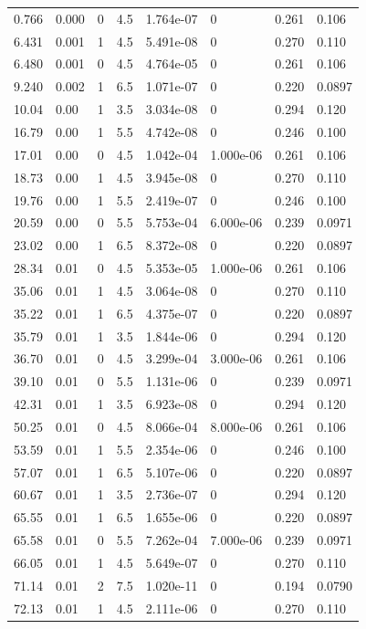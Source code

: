 \documentclass[preview]{standalone}
\begin{document}
{{\begin{tabular}{L{1.2cm}C{1.2cm} C{0.3cm}C{0.5cm} C{1.4cm}C{1.4cm} C{1.4cm}C{1.4cm}}
  0.766  &  0.000  & 0     & 4.5 &  1.764e-07  & 0  & 0.261 &  0.106   \\ 
  6.431  &  0.001  & 1     & 4.5 &  5.491e-08  & 0  & 0.270 &  0.110   \\ 
  6.480  &  0.001  & 0     & 4.5 &  4.764e-05  & 0  & 0.261 &  0.106   \\ 
  9.240  &  0.002  & 1     & 6.5 &  1.071e-07  & 0  & 0.220 &  0.0897   \\ 
  10.04  &  0.00  & 1     & 3.5 &  3.034e-08  & 0  & 0.294 &  0.120   \\ 
  16.79  &  0.00  & 1     & 5.5 &  4.742e-08  & 0  & 0.246 &  0.100   \\ 
  17.01  &  0.00  & 0     & 4.5 &  1.042e-04  & 1.000e-06  & 0.261 &  0.106   \\ 
  18.73  &  0.00  & 1     & 4.5 &  3.945e-08  & 0  & 0.270 &  0.110   \\ 
  19.76  &  0.00  & 1     & 5.5 &  2.419e-07  & 0  & 0.246 &  0.100   \\ 
  20.59  &  0.00  & 0     & 5.5 &  5.753e-04  & 6.000e-06  & 0.239 &  0.0971   \\ 
  23.02  &  0.00  & 1     & 6.5 &  8.372e-08  & 0  & 0.220 &  0.0897   \\ 
  28.34  &  0.01  & 0     & 4.5 &  5.353e-05  & 1.000e-06  & 0.261 &  0.106   \\ 
  35.06  &  0.01  & 1     & 4.5 &  3.064e-08  & 0  & 0.270 &  0.110   \\ 
  35.22  &  0.01  & 1     & 6.5 &  4.375e-07  & 0  & 0.220 &  0.0897   \\ 
  35.79  &  0.01  & 1     & 3.5 &  1.844e-06  & 0  & 0.294 &  0.120   \\ 
  36.70  &  0.01  & 0     & 4.5 &  3.299e-04  & 3.000e-06  & 0.261 &  0.106   \\ 
  39.10  &  0.01  & 0     & 5.5 &  1.131e-06  & 0  & 0.239 &  0.0971   \\ 
  42.31  &  0.01  & 1     & 3.5 &  6.923e-08  & 0  & 0.294 &  0.120   \\ 
  50.25  &  0.01  & 0     & 4.5 &  8.066e-04  & 8.000e-06  & 0.261 &  0.106   \\ 
  53.59  &  0.01  & 1     & 5.5 &  2.354e-06  & 0  & 0.246 &  0.100   \\ 
  57.07  &  0.01  & 1     & 6.5 &  5.107e-06  & 0  & 0.220 &  0.0897   \\ 
  60.67  &  0.01  & 1     & 3.5 &  2.736e-07  & 0  & 0.294 &  0.120   \\ 
  65.55  &  0.01  & 1     & 6.5 &  1.655e-06  & 0  & 0.220 &  0.0897   \\ 
  65.58  &  0.01  & 0     & 5.5 &  7.262e-04  & 7.000e-06  & 0.239 &  0.0971   \\ 
  66.05  &  0.01  & 1     & 4.5 &  5.649e-07  & 0  & 0.270 &  0.110   \\ 
  71.14  &  0.01  & 2     & 7.5 &  1.020e-11  & 0  & 0.194 &  0.0790   \\ 
  72.13  &  0.01  & 1     & 4.5 &  2.111e-06  & 0  & 0.270 &  0.110   \\ 
\hline 
\end{tabular} 

}}
\end{document}
